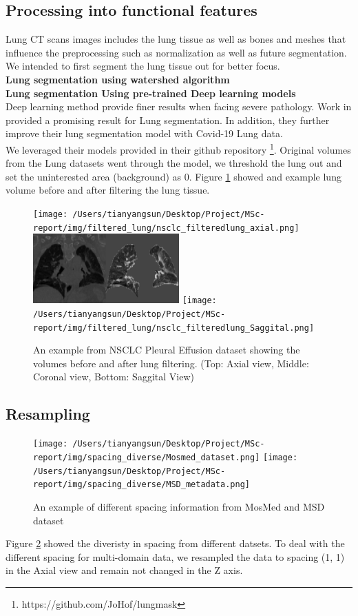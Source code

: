 \subsection{Processing into functional features}
Lung CT scans images includes the lung tissue as well as bones and meshes that influence the preprocessing such as normalization as well as future segmentation. We intended to first segment the lung tissue out for better focus.\\
\textbf{Lung segmentation using watershed algorithm}\\

\textbf{Lung segmentation Using pre-trained Deep learning models}\\
Deep learning method provide finer results when facing severe pathology. Work in \cite{hofmanninger_automatic_2020} provided a promising result for Lung segmentation. In addition, they further improve their lung segmentation model with Covid-19 Lung data.\\

We leveraged their models provided in their github repository \footnote{https://github.com/JoHof/lungmask}. Original volumes from the Lung datasets went through the model, we threshold the lung out and set the uninterested area (background) as 0. Figure \ref{fig:filtered_Lung} showed and example lung volume before and after filtering the lung tissue.

\begin{figure}[h]
\centering
\texttt{[image: /Users/tianyangsun/Desktop/Project/MSc-report/img/filtered\_lung/nsclc\_filteredlung\_axial.png]}
\includegraphics[width=0.5\textwidth]{img/filtered_lung/nsclc_filtered_coronal.png}
\texttt{[image: /Users/tianyangsun/Desktop/Project/MSc-report/img/filtered\_lung/nsclc\_filteredlung\_Saggital.png]}
\caption{An example from NSCLC Pleural Effusion dataset showing the volumes before and after lung filtering. (Top: Axial view, Middle: Coronal view, Bottom: Saggital View)}
\label{fig:filtered_Lung}
\end{figure}

\subsection{Resampling}
\begin{figure}[h]
	\centering
	\texttt{[image: /Users/tianyangsun/Desktop/Project/MSc-report/img/spacing\_diverse/Mosmed\_dataset.png]}
	\texttt{[image: /Users/tianyangsun/Desktop/Project/MSc-report/img/spacing\_diverse/MSD\_metadata.png]}
	\caption{An example of different spacing information from MosMed and MSD dataset}
	\label{fig:Spacediverse}
\end{figure}
Figure \ref{fig:Spacediverse} showed the diveristy in spacing from different datsets. To deal with the different spacing for multi-domain data, we resampled the data to spacing (1, 1) in the Axial view and remain not changed in the Z axis.

